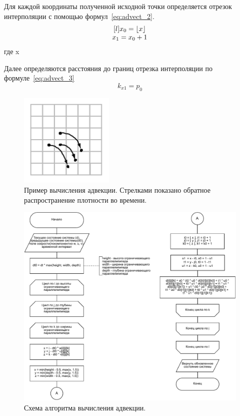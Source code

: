 Для каждой координаты полученной исходной точки определяется отрезок интерполяции с помощью формул~\ref{eq:advect_2}. 
\begin{equation}
	\label{eq:advect_2}
	\begin{matrix}[l]
		x_0 = \lfloor x \rfloor \\
		x_1 = x_0 + 1
	\end{matrix}
\end{equation}
где x

Далее определяются расстояния до границ отрезка интерполяции по формуле~\ref{eq:advect_3}
\begin{equation}
	\label{eq:advect_3}
	k_{x1} = p_0
\end{equation}
\begin{figure}[H]
	\centering
	\includegraphics[width=0.4\textwidth,page=1]{assets/img/advect.png}
	\caption{Пример вычисления адвекции. Стрелками показано обратное распространение плотности во времени.}
	\label{fig:advect_idea}
\end{figure}

\begin{figure}[H]
	\centering
	\includegraphics[width=1.0\textwidth,page=1]{assets/img/advect.pdf}
	\caption{Схема алгоритма вычисления адвекции.}
	\label{fig:advect}
\end{figure}

